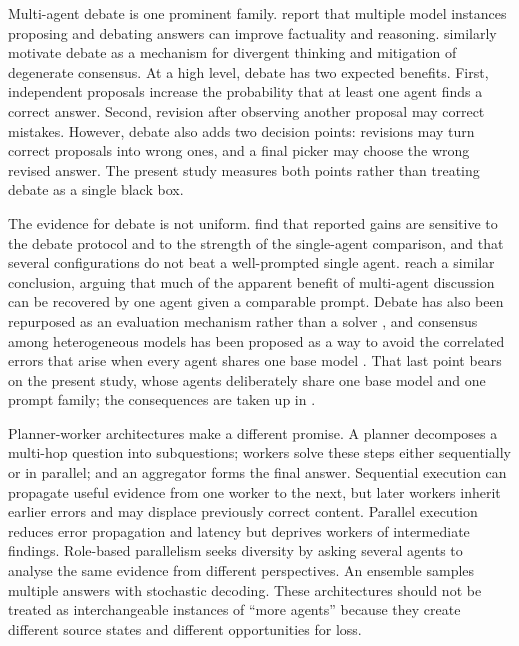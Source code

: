 Multi-agent debate is one prominent family. \citet{du2023debate} report that multiple model instances proposing and debating answers can improve factuality and reasoning. \citet{liang2023mad} similarly motivate debate as a mechanism for divergent thinking and mitigation of degenerate consensus. At a high level, debate has two expected benefits. First, independent proposals increase the probability that at least one agent finds a correct answer. Second, revision after observing another proposal may correct mistakes. However, debate also adds two decision points: revisions may turn correct proposals into wrong ones, and a final picker may choose the wrong revised answer. The present study measures both points rather than treating debate as a single black box.

The evidence for debate is not uniform. \citet{smit2024mad} find that reported gains are sensitive to the debate protocol and to the strength of the single-agent comparison, and that several configurations do not beat a well-prompted single agent. \citet{wang2024rethinking} reach a similar conclusion, arguing that much of the apparent benefit of multi-agent discussion can be recovered by one agent given a comparable prompt. Debate has also been repurposed as an evaluation mechanism rather than a solver \citep{chan2024chateval}, and consensus among heterogeneous models has been proposed as a way to avoid the correlated errors that arise when every agent shares one base model \citep{chen2024reconcile}. That last point bears on the present study, whose agents deliberately share one base model and one prompt family; the consequences are taken up in .

Planner-worker architectures make a different promise. A planner decomposes a multi-hop question into subquestions; workers solve these steps either sequentially or in parallel; and an aggregator forms the final answer. Sequential execution can propagate useful evidence from one worker to the next, but later workers inherit earlier errors and may displace previously correct content. Parallel execution reduces error propagation and latency but deprives workers of intermediate findings. Role-based parallelism seeks diversity by asking several agents to analyse the same evidence from different perspectives. An ensemble samples multiple answers with stochastic decoding. These architectures should not be treated as interchangeable instances of ``more agents'' because they create different source states and different opportunities for loss.

